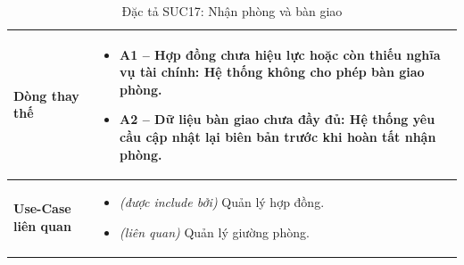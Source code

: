 \begin{table}[H]
\begin{tabularx}{\textwidth}{|>{\centering\arraybackslash\bfseries}m{3.5cm}|X|}
    \hline
    Dòng thay thế &
    \begin{itemize}[leftmargin=*, nosep, label=-]
        \vspace{0.1cm}
        \item \textbf{A1 -- Hợp đồng chưa hiệu lực hoặc còn thiếu nghĩa vụ tài chính:} Hệ thống không cho phép bàn giao phòng.
        \item \textbf{A2 -- Dữ liệu bàn giao chưa đầy đủ:} Hệ thống yêu cầu cập nhật lại biên bản trước khi hoàn tất nhận phòng.
    \end{itemize} \\
    \hline
    Use-Case liên quan &
    \begin{itemize}[leftmargin=*, nosep, label=-]
        \vspace{0.1cm}
        \item \textit{(được include bởi)} Quản lý hợp đồng.
        \item \textit{(liên quan)} Quản lý giường phòng.
\end{itemize} \\
    \hline
\end{tabularx}
\caption{Đặc tả SUC17: Nhận phòng và bàn giao}
\end{table}



\vspace{1cm}

